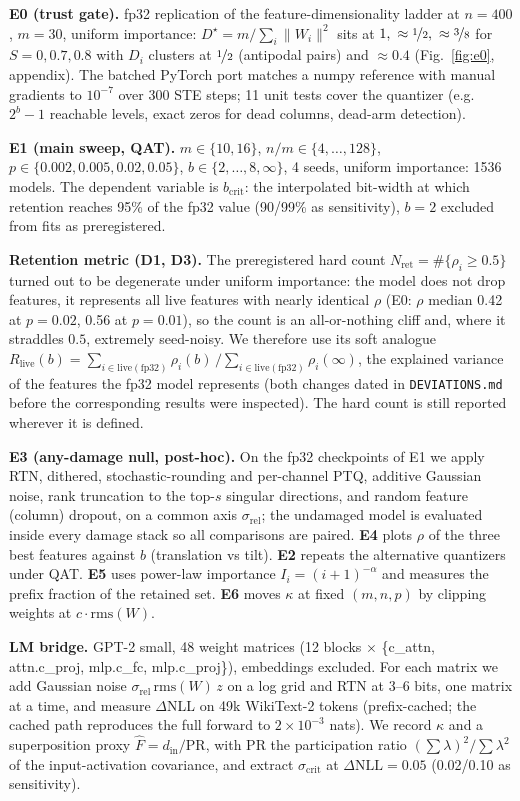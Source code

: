 \documentclass{article}
\begin{document}
\textbf{E0 (trust gate).} fp32 replication of the feature-dimensionality ladder at $n=400$, $m=30$, uniform importance:
$D^\star = m/\sum_i\lVert W_i\rVert^2$ sits at $1,\ \approx\nicefrac12,\ \approx\nicefrac38$ for $S = 0, 0.7, 0.8$ with
$D_i$ clusters at $\nicefrac12$ (antipodal pairs) and $\approx0.4$ (Fig.~\ref{fig:e0}, appendix). The batched PyTorch
port matches a numpy reference with manual gradients to $10^{-7}$ over 300 STE steps; 11 unit tests cover the quantizer
(e.g.\ $2^b-1$ reachable levels, exact zeros for dead columns, dead-arm detection).

\textbf{E1 (main sweep, QAT).} $m\in\{10,16\}$, $n/m\in\{4,\dots,128\}$, $p\in\{0.002,0.005,0.02,0.05\}$,
$b\in\{2,\dots,8,\infty\}$, 4 seeds, uniform importance: 1536 models. The dependent variable is
$b_{\mathrm{crit}}$: the interpolated bit-width at which retention reaches 95\% of the fp32 value (90/99\% as sensitivity),
$b=2$ excluded from fits as preregistered.

\textbf{Retention metric (D1, D3).} The preregistered hard count $N_{\mathrm{ret}}=\#\{\rho_i\ge0.5\}$ turned out to be
degenerate under uniform importance: the model does not drop features, it represents all live features with nearly
identical $\rho$ (E0: $\rho$ median 0.42 at $p=0.02$, 0.56 at $p=0.01$), so the count is an all-or-nothing cliff and,
where it straddles $0.5$, extremely seed-noisy. We therefore use its soft analogue
$R_{\mathrm{live}}(b) = \sum_{i\in\mathrm{live(fp32)}}\rho_i(b)\,/\sum_{i\in\mathrm{live(fp32)}}\rho_i(\infty)$, the
explained variance of the features the fp32 model represents (both changes dated in \texttt{DEVIATIONS.md} before the
corresponding results were inspected). The hard count is still reported wherever it is defined.

\textbf{E3 (any-damage null, post-hoc).} On the fp32 checkpoints of E1 we apply RTN, dithered, stochastic-rounding and
per-channel PTQ, additive Gaussian noise, rank truncation to the top-$s$ singular directions, and random feature
(column) dropout, on a common axis $\sigma_{\mathrm{rel}}$; the undamaged model is evaluated inside every damage stack
so all comparisons are paired. \textbf{E4} plots $\rho$ of the three best features against $b$ (translation vs tilt).
\textbf{E2} repeats the alternative quantizers under QAT. \textbf{E5} uses power-law importance
$I_i=(i+1)^{-\alpha}$ and measures the prefix fraction of the retained set. \textbf{E6} moves $\kappa$ at fixed
$(m,n,p)$ by clipping weights at $c\cdot\mathrm{rms}(W)$.

\textbf{LM bridge.} GPT-2 small, 48 weight matrices (12 blocks $\times$ \{c\_attn, attn.c\_proj, mlp.c\_fc,
mlp.c\_proj\}), embeddings excluded. For each matrix we add Gaussian noise $\sigma_{\mathrm{rel}}\,\mathrm{rms}(W)\,z$
on a log grid and RTN at 3--6 bits, one matrix at a time, and measure $\Delta$NLL on 49k WikiText-2 tokens
(prefix-cached; the cached path reproduces the full forward to $2\times10^{-3}$ nats). We record $\kappa$ and a
superposition proxy $\hat F = d_{\mathrm{in}}/\mathrm{PR}$, with PR the participation ratio $(\sum\lambda)^2/\sum\lambda^2$
of the input-activation covariance, and extract $\sigma_{\mathrm{crit}}$ at $\Delta\mathrm{NLL}=0.05$ (0.02/0.10 as
sensitivity).
\end{document}

